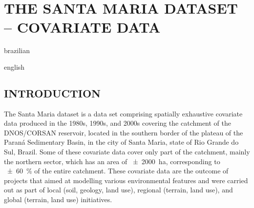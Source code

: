 \artigotrue
\chapter{THE SANTA MARIA DATASET -- COVARIATE DATA}
\label{chap:chap04}



\def\ptkeys{}

\begin{chapterabstract}{brazilian}{\ptkeys}
 
\end{chapterabstract}

\def\enkeys{}
  
\begin{chapterabstract}{english}{\enkeys}
 
\end{chapterabstract}

\formatchapter

\section{INTRODUCTION}
\label{sec:covar-data-intro}


The Santa Maria dataset is a data set comprising spatially exhaustive covariate data produced in the 1980s, 
1990s, and 2000s covering the catchment of the DNOS/CORSAN reservoir, located in the southern border of the 
plateau of the Paraná Sedimentary Basin, in the city of Santa Maria, state of Rio Grande do Sul, Brazil. Some 
of these covariate data cover only part of the catchment, mainly the northern sector, which has an area of 
\SI{\pm2000}{\hectare}, corresponding to \SI{\pm60}{\percent} of the entire catchment. These covariate data 
are the outcome of projects that aimed at modelling various environmental features and were carried out as 
part of local (soil, geology, land use), regional (terrain, land use), and global (terrain, land use) 
initiatives.

